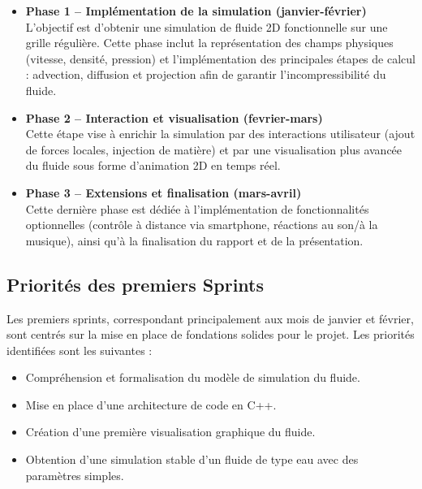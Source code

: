 \documentclass{article}
\begin{document}
   \begin{itemize}
    
    \item \textbf{Phase 1 – Implémentation de la simulation (janvier-février)} \\
    L’objectif est d’obtenir une simulation de fluide 2D fonctionnelle sur une grille régulière. 
    Cette phase inclut la représentation des champs physiques (vitesse, densité, pression) et l’implémentation des 
    principales étapes de calcul : advection, diffusion et projection afin de garantir l’incompressibilité du fluide.
    
    \item \textbf{Phase 2 – Interaction et visualisation (fevrier-mars)} \\
    Cette étape vise à enrichir la simulation par des interactions utilisateur (ajout de forces locales, 
    injection de matière) et par une visualisation plus avancée du fluide sous forme d’animation 2D en temps réel.
    
    \item \textbf{Phase 3 – Extensions et finalisation (mars-avril)} \\
    Cette dernière phase est dédiée à l’implémentation de fonctionnalités optionnelles (contrôle à distance via 
    smartphone, réactions au son/à la musique), ainsi qu’à la finalisation du rapport et de la présentation.
   \end{itemize}


   \subsection{Priorités des premiers Sprints}
   Les premiers sprints, correspondant principalement aux mois de janvier et février, sont centrés sur la mise en 
   place de fondations solides pour le projet. Les priorités identifiées sont les suivantes :

   \begin{itemize}
      \item Compréhension et formalisation du modèle de simulation du fluide.
      \item Mise en place d’une architecture de code en C++.
      \item Création d’une première visualisation graphique du fluide.
      \item Obtention d’une simulation stable d’un fluide de type eau avec des paramètres simples.
   \end{itemize}
\end{document}
